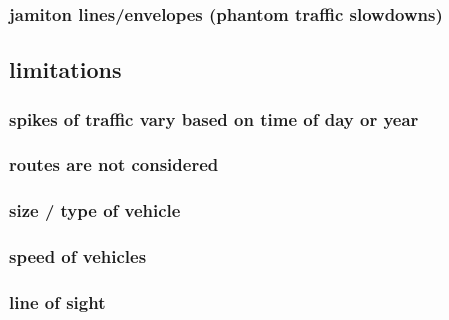 \documentclass[letterpaper]{article}
\begin{document}
\subsubsection{jamiton lines/envelopes (phantom traffic slowdowns)}
\label{sec:org1f6a382}
\subsection{limitations}
\label{sec:org56c476d}
\subsubsection{spikes of traffic vary based on time of day or year}
\label{sec:org0213e92}
\subsubsection{routes are not considered}
\label{sec:orgbc0232a}
\subsubsection{size / type of vehicle}
\label{sec:org2624ab9}
\subsubsection{speed of vehicles}
\label{sec:orge7163e1}
\subsubsection{line of sight}
\label{sec:org0516f1f}
\end{document}
